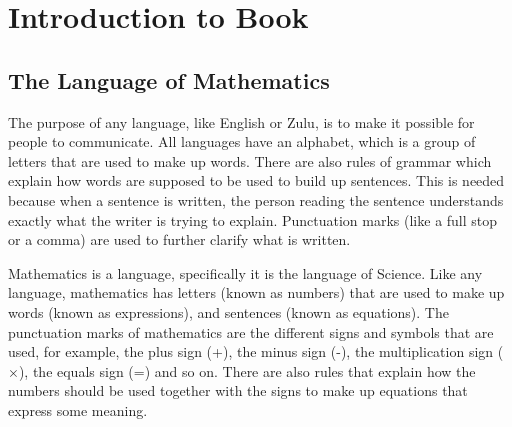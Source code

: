 \chapter{Introduction to Book}
\label{mathintro}

\section{The Language of Mathematics}
The purpose of any language, like English or Zulu, is to make it possible for people to communicate. All languages have an alphabet, which is a group of letters that are used to make up words. There are also rules of grammar which explain how words are supposed to be used to build up sentences. This is needed because when a sentence is written, the person reading the sentence understands exactly what the writer is trying to explain. Punctuation marks (like a full stop or a comma) are used to further clarify what is written.

Mathematics is a language, specifically it is the language of Science. Like any language, mathematics has letters (known as numbers) that are used to make up words (known as expressions), and sentences (known as equations). The punctuation marks of mathematics are the different signs and symbols that are used, for example, the plus sign (+), the minus sign (-), the multiplication sign ($\times$), the equals sign (=) and so on. There are also rules that explain how the numbers should be used together with the signs to make up equations that express some meaning.

